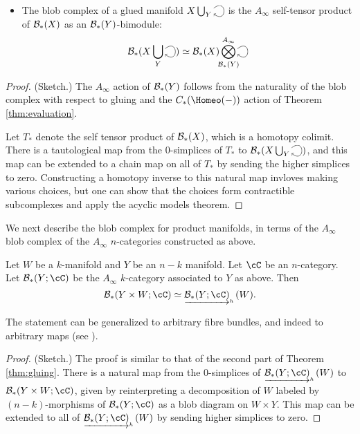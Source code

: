 \documentclass{pnastwo}
\begin{document}
\begin{article}
\begin{thm}
\begin{itemize}
\item The blob complex of a glued manifold $X\bigcup_Y \selfarrow$ is the $A_\infty$ self-tensor product of
${\mathcal B}_*(X)$ as an ${\mathcal B}_*(Y)$-bimodule:
\begin{equation*}
\bc_*(X\bigcup_Y \selfarrow) \simeq \bc_*(X) \Tensor^{A_\infty}_{\mathclap{\bc_*(Y)}} \selfarrow
\end{equation*}
\end{itemize}
\end{thm}

\begin{proof} (Sketch.)
The $A_\infty$ action of ${\mathcal B}_*(Y)$ follows from the naturality of the blob complex with respect to gluing
and the $C_*(\Homeo(-))$ action of Theorem \ref{thm:evaluation}.

Let $T_*$ denote the self tensor product of ${\mathcal B}_*(X)$, which is a homotopy colimit.
There is a tautological map from the 0-simplices of $T_*$ to $\bc_*(X\bigcup_Y \selfarrow)$,
and this map can be extended to a chain map on all of $T_*$ by sending the higher simplices to zero.
Constructing a homotopy inverse to this natural map invloves making various choices, but one can show that the
choices form contractible subcomplexes and apply the acyclic models theorem.
\end{proof}

We next describe the blob complex for product manifolds, in terms of the $A_\infty$ blob complex of the $A_\infty$ $n$-categories constructed as above.

\begin{thm}
\label{thm:product}
Let $W$ be a $k$-manifold and $Y$ be an $n-k$ manifold.
Let $\cC$ be an $n$-category.
Let $\bc_*(Y;\cC)$ be the $A_\infty$ $k$-category associated to $Y$ as above.
Then
\[
	\bc_*(Y\times W; \cC) \simeq \clh{\bc_*(Y;\cC)}(W).
\]
\end{thm}
The statement can be generalized to arbitrary fibre bundles, and indeed to arbitrary maps
(see \cite[\S7.1]{1009.5025}).

\begin{proof} (Sketch.)
The proof is similar to that of the second part of Theorem \ref{thm:gluing}.
There is a natural map from the 0-simplices of $\clh{\bc_*(Y;\cC)}(W)$ to $\bc_*(Y\times W; \cC)$,
given by reinterpreting a decomposition of $W$ labeled by $(n{-}k)$-morphisms of $\bc_*(Y; \cC)$ as a blob 
diagram on $W\times Y$.
This map can be extended to all of $\clh{\bc_*(Y;\cC)}(W)$ by sending higher simplices to zero.


\end{proof}
\end{article}
\end{document}
